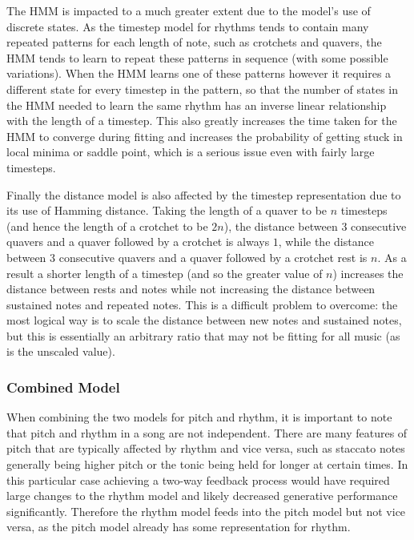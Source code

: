 \documentclass[ author={Stephen Livermore-Tozer},
				supervisor={Dr. Peter Flach},
				degree={MEng},
				title={Algorithmic Co-composition Using Machine Learning},
				subtitle={},
				type={research},
				year={2016} ]{dissertation}
\begin{document}
	The HMM is impacted to a much greater extent due to the model's use of discrete states. As the timestep model for rhythms tends to contain many repeated patterns for each length of note, such as crotchets and quavers, the HMM tends to learn to repeat these patterns in sequence (with some possible variations). When the HMM learns one of these patterns however it requires a different state for every timestep in the pattern, so that the number of states in the HMM needed to learn the same rhythm has an inverse linear relationship with the length of a timestep. This also greatly increases the time taken for the HMM to converge during fitting and increases the probability of getting stuck in local minima or saddle point, which is a serious issue even with fairly large timesteps. 
	
	Finally the distance model is also affected by the timestep representation due to its use of Hamming distance. Taking the length of a quaver to be $n$ timesteps (and hence the length of a crotchet to be $2n$), the distance between 3 consecutive quavers and a quaver followed by a crotchet is always $1$, while the distance between 3 consecutive quavers and a quaver followed by a crotchet rest is $n$. As a result a shorter length of a timestep (and so the greater value of $n$) increases the distance between rests and notes while not increasing the distance between sustained notes and repeated notes. This is a difficult problem to overcome: the most logical way is to scale the distance between new notes and sustained notes, but this is essentially an arbitrary ratio that may not be fitting for all music (as is the unscaled value). 
	
	\subsubsection{Combined Model}
	
	When combining the two models for pitch and rhythm, it is important to note that pitch and rhythm in a song are not independent. There are many features of pitch that are typically affected by rhythm and vice versa, such as staccato notes generally being higher pitch or the tonic being held for longer at certain times. In this particular case achieving a two-way feedback process would have required large changes to the rhythm model and likely decreased generative performance significantly. Therefore the rhythm model feeds into the pitch model but not vice versa, as the pitch model already has some representation for rhythm.
	
\end{document}

